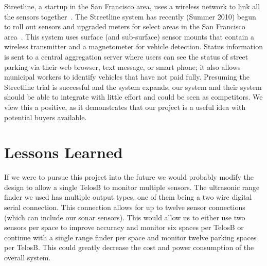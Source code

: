 \documentclass{acm_proc}
\begin{document}
Streetline, a startup in the San Francisco area, uses a wireless network to
link all the sensors together~\cite{pgi:streetline}.
The Streetline system has recently (Summer 2010) begun to roll out sensors
and upgraded meters for select areas in the San Francisco
area~\cite{wired:streetline, sfpark}.
This system uses surface (and sub-surface) sensor mounts that contain a
wireless transmitter and a magnetometer for vehicle detection.
Status information is sent to a central aggregation server where users can
see the status of street parking via their web browser, text message, or
smart phone; it also allows municipal workers to identify vehicles that
have not paid fully.
Presuming the Streetline trial is successful and the system expands, our
system and their system should be able to integrate with little effort and
could be seen as competitors.
We view this a positive, as it demonstrates that our project is a useful
idea with potential buyers available.


\section{Lessons Learned}\label{sec:lessons}

If we were to pursue this project into the future we would probably modify
the design to allow a single TelosB to monitor multiple sensors.  The
ultrasonic range finder we used has multiple output types, one of them
being a two wire digital serial connection.  This connection allows for up
to twelve sensor connections (which can include our sonar sensors).
This would allow us to either use two sensors per space to improve accuracy
and monitor six spaces per TelosB or continue with a single range finder
per space and monitor twelve parking spaces per TelosB.
This could greatly decrease the cost and power consumption of the overall
system.
\end{document}
